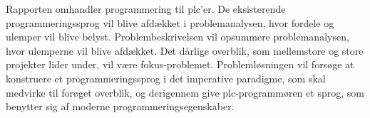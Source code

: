 Rapporten omhandler programmering til \gls{plc}'er. De eksisterende programmeringssprog vil blive afdækket i problemanalysen, hvor fordele og ulemper vil blive belyst. Problembeskrivelsen vil opsummere problemanalysen, hvor ulemperne vil blive afdækket. Det dårlige overblik, som mellemstore og store projekter lider under, vil være fokus-problemet. Problemløsningen vil forsøge at konstruere et programmeringssprog i det imperative paradigme, som skal medvirke til forøget overblik, og derigennem give \gls{plc}-programmøren et sprog, som benytter sig af moderne programmeringsegenskaber.